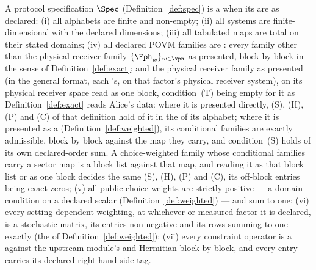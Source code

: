 \begin{definition}\label{def:well-formed-spec}
A protocol specification $\Spec$ (Definition~\ref{def:spec}) is a
when its  are as declared:
(i) all alphabets are finite and non-empty;
(ii) all systems are finite-dimensional with the declared dimensions;
(iii) all tabulated maps are total on their stated domains;
(iv) all declared POVM families are : every family
other than the physical receiver family $\{\Fph_w\}_{w\in\Vph}$ as presented,
block by block in the sense of Definition~\ref{def:exact}; and the physical
receiver family as presented (in the general format, each
's, on that factor's physical receiver system), on its
physical receiver space read as one block, condition~(T) being empty for it
as Definition~\ref{def:exact} reads Alice's data: where it is presented
directly, (S), (H), (P) and (C) of that definition hold of it in the
 of its alphabet; where it is presented as a
 (Definition~\ref{def:weighted}), its
conditional families are exactly admissible, block by block against the map
they carry, and condition~(S) holds of its own declared-order sum. A
choice-weighted family whose conditional families carry a sector map is a
block list against that map, and reading it as that block list or as one
block decides the same (S), (H), (P) and (C), its off-block entries being
exact zeros;
(v) all public-choice weights are strictly positive --- a domain condition on
a declared scalar (Definition~\ref{def:weighted}) --- and sum to one;
(vi) every setting-dependent weighting, at whichever  or
measured factor it is declared, is a stochastic matrix, its
entries non-negative and its rows summing to one exactly (the
 of Definition~\ref{def:weighted});
(vii) every constraint operator is a  against the upstream
module's  and Hermitian block by block, and every entry
carries its declared right-hand-side tag.
\end{definition}
